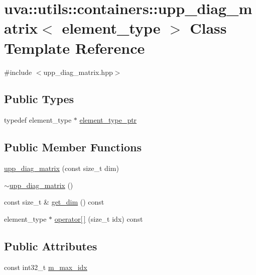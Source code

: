 \hypertarget{classuva_1_1utils_1_1containers_1_1upp__diag__matrix}{}\section{uva\+:\+:utils\+:\+:containers\+:\+:upp\+\_\+diag\+\_\+matrix$<$ element\+\_\+type $>$ Class Template Reference}
\label{classuva_1_1utils_1_1containers_1_1upp__diag__matrix}


{\ttfamily \#include $<$upp\+\_\+diag\+\_\+matrix.\+hpp$>$}

\subsection*{Public Types}
\begin{DoxyCompactItemize}
\item 
typedef element\+\_\+type $\ast$ \hyperlink{classuva_1_1utils_1_1containers_1_1upp__diag__matrix_aa99e18b84aa337bcaed5af65471861bb}{element\+\_\+type\+\_\+ptr}
\end{DoxyCompactItemize}
\subsection*{Public Member Functions}
\begin{DoxyCompactItemize}
\item 
\hyperlink{classuva_1_1utils_1_1containers_1_1upp__diag__matrix_ae85af9b7c42197ad9581df4a278e4db9}{upp\+\_\+diag\+\_\+matrix} (const size\+\_\+t dim)
\item 
\hyperlink{classuva_1_1utils_1_1containers_1_1upp__diag__matrix_a8dce5cc9621b7ba9847eced6cec0789b}{$\sim$upp\+\_\+diag\+\_\+matrix} ()
\item 
const size\+\_\+t \& \hyperlink{classuva_1_1utils_1_1containers_1_1upp__diag__matrix_a1a336f69bdb83f0b934dd1426ee43f34}{get\+\_\+dim} () const 
\item 
element\+\_\+type $\ast$ \hyperlink{classuva_1_1utils_1_1containers_1_1upp__diag__matrix_a376bbaa02ec6064116712c77a568de67}{operator\mbox{[}$\,$\mbox{]}} (size\+\_\+t idx) const 
\end{DoxyCompactItemize}
\subsection*{Public Attributes}
\begin{DoxyCompactItemize}
\item 
const int32\+\_\+t \hyperlink{classuva_1_1utils_1_1containers_1_1upp__diag__matrix_a9b4843aa9444be43cb25dab7d7a80f0b}{m\+\_\+max\+\_\+idx}
\end{DoxyCompactItemize}
